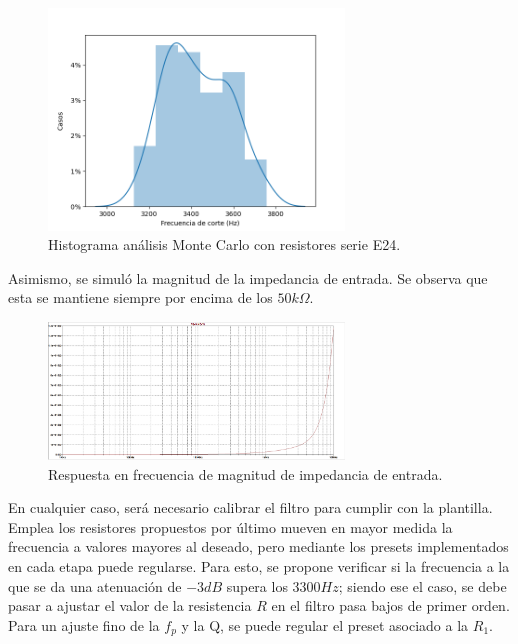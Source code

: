 \begin{figure}[H]
    \centering
    \includegraphics[width= 0.7\textwidth]{../Ejercicio2-DisenoDeCeldas/1CeldaSallenKey/images/MCE24.png}
    \caption{Histograma análisis Monte Carlo con resistores serie E24.}
    \label{fig:MCE96}
\end{figure}

Asimismo, se simuló la magnitud de la impedancia de entrada. Se observa que esta se mantiene siempre por encima de los $50k\Omega$. 

\begin{figure}[H]
    \centering
        \includegraphics[width= 0.7\textwidth]{../Ejercicio2-DisenoDeCeldas/1CeldaSallenKey/images/Zin.png}
    \caption{Respuesta en frecuencia de magnitud de impedancia de entrada.}
    \label{fig:Zin}
\end{figure}



En cualquier caso, será necesario calibrar el filtro para cumplir con la plantilla. Emplea los resistores propuestos por último mueven en mayor medida la frecuencia a valores mayores al deseado, pero mediante los presets implementados en cada etapa puede regularse. Para esto, se propone verificar si la frecuencia a la que se da una atenuación de $-3dB$ supera los $3300Hz$; siendo ese el caso, se debe pasar a ajustar el valor de la resistencia $R$ en el filtro pasa bajos de primer orden. Para un ajuste fino de la $f_{p}$ y la Q, se puede regular el preset asociado a la $R_{1}$.



